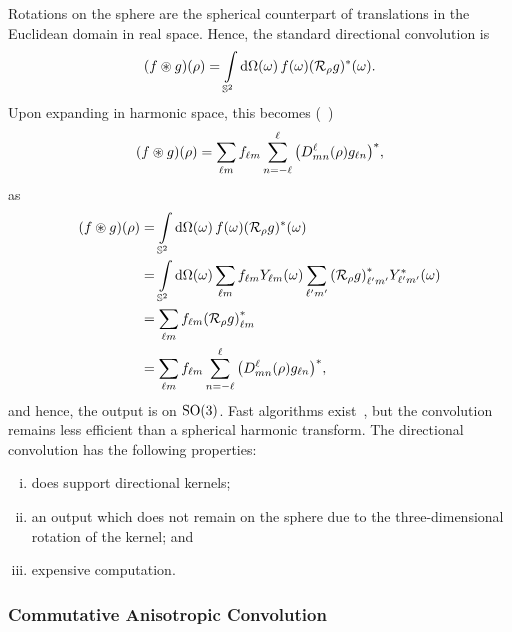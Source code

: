 Rotations on the sphere are the spherical counterpart of translations in the Euclidean domain in real space.
Hence, the standard directional convolution is
%
\begin{equation}\label{eq:chapter3_directional_convolution}
	(f \circledast g)(\rho)
	= \integrateSphere{\omega} \pixel{f} \pixel{\conj{(\rotation{\rho}g)}}.
\end{equation}
%
Upon expanding in harmonic space, this becomes (\eg{}~\cite{McEwen2007,Wandelt2001})
%
\begin{equation}
	(f \circledast g) (\rho)
	= \harmonicSum \harmonic{f} \sum\limits_{n=-\ell}^{\ell} \conj{\big(\wigner{\ell}{m}{n}(\rho) g_{\ell n}\big)},
\end{equation}
%
as
%
\begin{align}
	(f \circledast g)(\rho)
	 & = \integrateSphere{\omega} \pixel{f} \pixel{\conj{(\rotation{\rho}g)}} \nonumber{}                                                                                           \\
	 & = \integrateSphere{\omega} \harmonicSum \harmonic{f} \pixel{\harmonic{Y}} \harmonicSum['] \conj{\harmonic[']{(\rotation{\rho}g)}} \pixel{\conj{\harmonic[']{Y}}} \nonumber{} \\
	 & = \harmonicSum \harmonic{f} \conj{\harmonic{(\rotation{\rho}g)}} \nonumber{}                                                                                              \\
	 & = \harmonicSum \harmonic{f} \sum\limits_{n=-\ell}^{\ell} \conj{\big(\wigner{\ell}{m}{n}(\rho) g_{\ell n}\big)},
\end{align}
%
and hence, the output is on \(\rotationGroup{}\).
Fast algorithms exist~\cite{McEwen2007,Wandelt2001,Wiaux2007,McEwen2013}, but the convolution remains less efficient than a spherical harmonic transform.
The directional convolution has the following properties:
%
\begin{enumerate}[(i),nosep,left=\parindent]
	\item does support directional kernels;
	\item an output which does not remain on the sphere due to the three-dimensional rotation of the kernel; and
	\item expensive computation.
\end{enumerate}

\subsubsection{Commutative Anisotropic Convolution}

